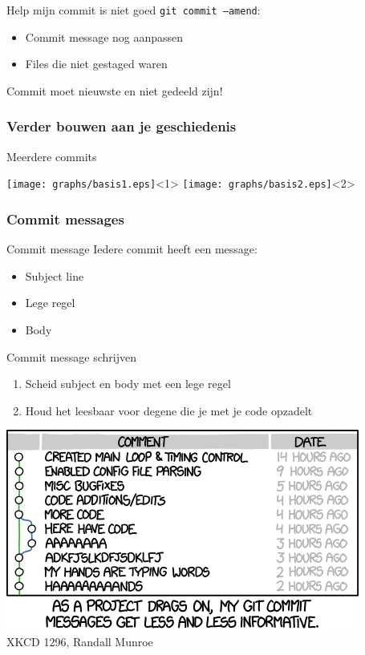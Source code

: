 \begin{frame}{Help mijn commit is niet goed}
	\texttt{git commit --amend}:
	\begin{itemize}
		\item Commit message nog aanpassen
		\item Files die niet gestaged waren
	\end{itemize}
	\alert{Commit moet nieuwste en niet gedeeld zijn!}
\end{frame}

\subsubsection{Verder bouwen aan je geschiedenis}
\begin{frame}{Meerdere commits}
	\begin{center}
		\texttt{[image: graphs/basis1.eps]}<1>
		\texttt{[image: graphs/basis2.eps]}<2>
	\end{center}
\end{frame}

\subsubsection{Commit messages}
\begin{frame}{Commit message}
	Iedere commit heeft een message:
	\begin{itemize}
		\item Subject line
		\item Lege regel
		\item Body
	\end{itemize}
\end{frame}

\begin{frame}{Commit message schrijven}
	\begin{enumerate}
		\item Scheid subject en body met een lege regel
		\item Houd het leesbaar voor degene die je met je code opzadelt
	\end{enumerate}
	\begin{center}
		\includegraphics[width=0.6\linewidth]{images/xkcd_git_commit}\\
		{\tiny XKCD 1296, Randall Munroe}
	\end{center}
\end{frame}

